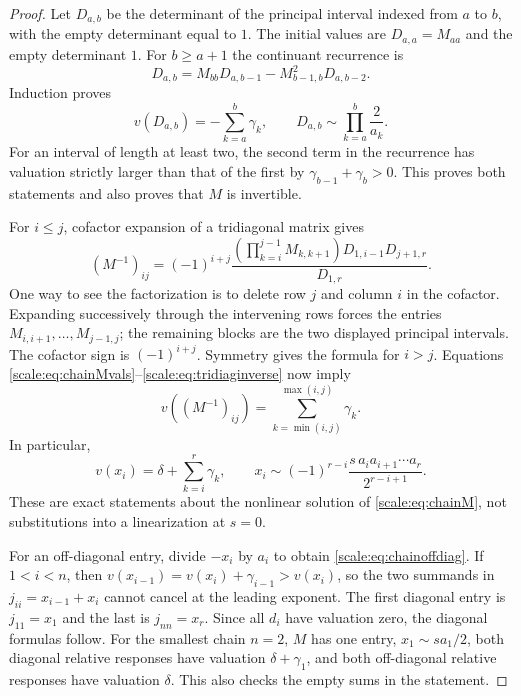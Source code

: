 \documentclass[11pt,a4paper]{article}
\numberwithin{equation}{section}
\theoremstyle{definition}
\begin{document}
\begin{proof}
Let $D_{a,b}$ be the determinant of the principal interval indexed
from $a$ to $b$, with the empty determinant equal to $1$.
The initial values are $D_{a,a}=M_{aa}$ and the empty determinant $1$.
For $b\geq a+1$ the continuant recurrence is
\[
 D_{a,b}=M_{bb}D_{a,b-1}-M_{b-1,b}^2D_{a,b-2}.
\]
Induction proves
\begin{equation}\label{scale:eq:continuantval}
 v(D_{a,b})=-\sum_{k=a}^b\gamma_k,
 \qquad D_{a,b}\sim\prod_{k=a}^b\frac{2}{a_k}.
\end{equation}
For an interval of length at least two, the second term in the
recurrence has valuation strictly larger than that of the first
by $\gamma_{b-1}+\gamma_b>0$. This proves both statements and also
proves that $M$ is invertible.

For $i\leq j$, cofactor expansion of a tridiagonal matrix gives
\begin{equation}\label{scale:eq:tridiaginverse}
 (M^{-1})_{ij}=(-1)^{i+j}
 \frac{\left(\prod_{k=i}^{j-1}M_{k,k+1}\right)
              D_{1,i-1}D_{j+1,r}}{D_{1,r}}.
\end{equation}
One way to see the factorization is to delete row $j$ and column
$i$ in the cofactor. Expanding successively through the intervening
rows forces the entries $M_{i,i+1},\ldots,M_{j-1,j}$; the remaining
blocks are the two displayed principal intervals. The cofactor sign
is $(-1)^{i+j}$. Symmetry gives the formula for $i>j$.
Equations \eqref{scale:eq:chainMvals}--\eqref{scale:eq:tridiaginverse}
now imply
\begin{equation}\label{scale:eq:inversechainval}
 v((M^{-1})_{ij})=\sum_{k=\min(i,j)}^{\max(i,j)}\gamma_k.
\end{equation}
In particular,
\begin{equation}\label{scale:eq:xival}
 v(x_i)=\delta+\sum_{k=i}^{r}\gamma_k,
 \qquad
 x_i\sim(-1)^{r-i}\frac{s\,a_i a_{i+1}\cdots a_r}{2^{r-i+1}}.
\end{equation}
These are exact statements about the nonlinear solution of
\eqref{scale:eq:chainM}, not substitutions into a linearization at
$s=0$.

For an off-diagonal entry, divide $-x_i$ by $a_i$ to obtain
\eqref{scale:eq:chainoffdiag}. If $1<i<n$, then
$v(x_{i-1})=v(x_i)+\gamma_{i-1}>v(x_i)$, so the two summands in
$j_{ii}=x_{i-1}+x_i$ cannot cancel at the leading exponent.
The first diagonal entry is $j_{11}=x_1$ and the last is
$j_{nn}=x_r$. Since all $d_i$ have valuation zero, the diagonal
formulas follow. For the smallest chain $n=2$, $M$ has one entry,
$x_1\sim s a_1/2$, both diagonal relative responses have valuation
$\delta+\gamma_1$, and both off-diagonal relative responses have valuation
$\delta$. This also checks the empty sums in the statement.
\end{proof}
\end{document}
